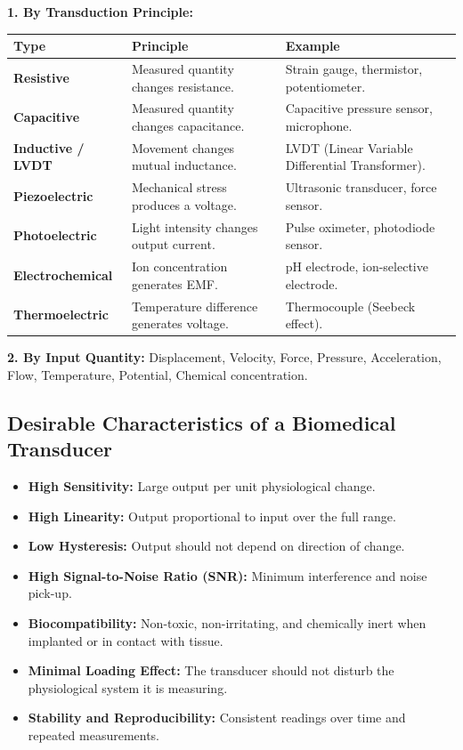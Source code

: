 \documentclass[12pt,a4paper]{article}
\begin{document}
\textbf{1. By Transduction Principle:}\par\noindent
\begin{tabularx}{\linewidth}{|B{3.0cm}|Y|Y|}
\hline
\textbf{Type} & \textbf{\color{myteal}Principle} & \textbf{\color{mygreen}Example} \\
\hline
\textbf{Resistive} & Measured quantity changes resistance. & Strain gauge, thermistor, potentiometer. \\
\hline
\textbf{Capacitive} & Measured quantity changes capacitance. & Capacitive pressure sensor, microphone. \\
\hline
\textbf{Inductive / LVDT} & Movement changes mutual inductance. & LVDT (Linear Variable Differential Transformer). \\
\hline
\textbf{Piezoelectric} & Mechanical stress produces a voltage. & Ultrasonic transducer, force sensor. \\
\hline
\textbf{Photoelectric} & Light intensity changes output current. & Pulse oximeter, photodiode sensor. \\
\hline
\textbf{Electrochemical} & Ion concentration generates EMF. & pH electrode, ion-selective electrode. \\
\hline
\textbf{Thermoelectric} & Temperature difference generates voltage. & Thermocouple (Seebeck effect). \\
\hline
\end{tabularx}

\textbf{2. By Input Quantity:} Displacement, Velocity, Force, Pressure, Acceleration, Flow, Temperature, Potential, Chemical concentration.

\subsection{Desirable Characteristics of a Biomedical Transducer}

\begin{itemize}[leftmargin=*, itemsep=3pt]
  \item \textbf{High Sensitivity:} Large output per unit physiological change.
  \item \textbf{High Linearity:} Output proportional to input over the full range.
  \item \textbf{Low Hysteresis:} Output should not depend on direction of change.
  \item \textbf{High Signal-to-Noise Ratio (SNR):} Minimum interference and noise pick-up.
  \item \textbf{Biocompatibility:} Non-toxic, non-irritating, and chemically inert when implanted or in contact with tissue.
  \item \textbf{Minimal Loading Effect:} The transducer should not disturb the physiological system it is measuring.
  \item \textbf{Stability and Reproducibility:} Consistent readings over time and repeated measurements.
\end{itemize}
\end{document}
